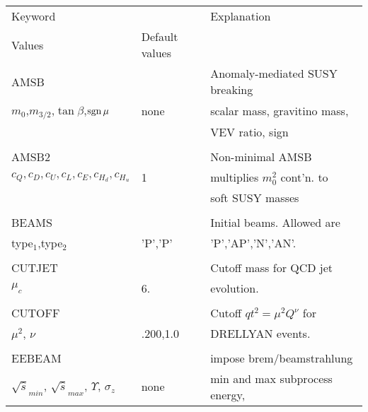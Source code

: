 \newpage
\begin{center}
\begin{tabular}{lll}
\hline\hline
Keyword                &                   & Explanation                    \\
Values                 & Default values    &                                \\
\hline
AMSB                   &                   & Anomaly-mediated SUSY breaking \\
$m_0$,$m_{3/2}$,$\tan\beta$,$\mathop{\rm sgn}\mu$ & none & scalar mass, gravitino mass, \\
                       &                   & VEV ratio, sign                \\
                       &                   &                                \\
AMSB2                  &                   & Non-minimal AMSB               \\
$c_Q,c_D,c_U,c_L,c_E,c_{H_d},c_{H_u}$ & 1  & multiplies $m_0^2$ cont'n. to  \\
                       &                   & soft SUSY masses               \\
                       &                   &                                \\
BEAMS                  &                   & Initial beams. Allowed are     \\
type$_1$,type$_2$      & 'P','P'           & 'P','AP','N','AN'.             \\
                       &                   &                                \\
CUTJET                 &                   & Cutoff mass for QCD jet        \\
$\mu_c$                & 6.                & evolution.                     \\
                       &                   &                                \\
CUTOFF                 &                   & Cutoff $qt^2=\mu^2Q^\nu$ for   \\
$\mu^2$, $\nu$         & .200,1.0          & DRELLYAN events.               \\
                       &                   &                                \\
EEBEAM                 &                   & impose brem/beamstrahlung      \\
$\sqrt{\hat{s}}_{min}$, $\sqrt{\hat{s}}_{max}$, $\Upsilon$, $\sigma_z$ &
none & min and max subprocess energy, \\

\end{tabular}
\end{center}
